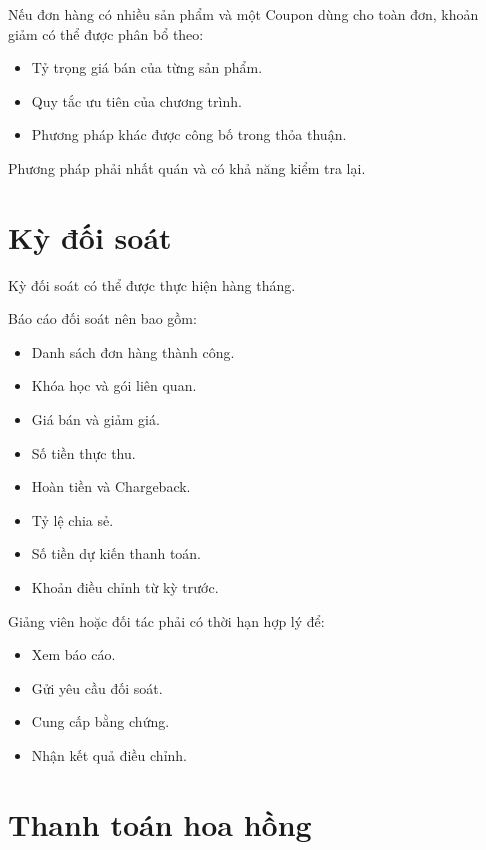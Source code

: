 \documentclass[12pt,a4paper]{article}
\begin{document}
Nếu đơn hàng có nhiều sản phẩm và một Coupon dùng cho toàn đơn,
khoản giảm có thể được phân bổ theo:

\begin{itemize}
    \item Tỷ trọng giá bán của từng sản phẩm.
    \item Quy tắc ưu tiên của chương trình.
    \item Phương pháp khác được công bố trong thỏa thuận.
\end{itemize}

Phương pháp phải nhất quán và có khả năng kiểm tra lại.

\section{Kỳ đối soát}

Kỳ đối soát có thể được thực hiện hàng tháng.

Báo cáo đối soát nên bao gồm:

\begin{itemize}
    \item Danh sách đơn hàng thành công.
    \item Khóa học và gói liên quan.
    \item Giá bán và giảm giá.
    \item Số tiền thực thu.
    \item Hoàn tiền và Chargeback.
    \item Tỷ lệ chia sẻ.
    \item Số tiền dự kiến thanh toán.
    \item Khoản điều chỉnh từ kỳ trước.
\end{itemize}

Giảng viên hoặc đối tác phải có thời hạn hợp lý để:

\begin{itemize}
    \item Xem báo cáo.
    \item Gửi yêu cầu đối soát.
    \item Cung cấp bằng chứng.
    \item Nhận kết quả điều chỉnh.
\end{itemize}

\section{Thanh toán hoa hồng}
\end{document}
